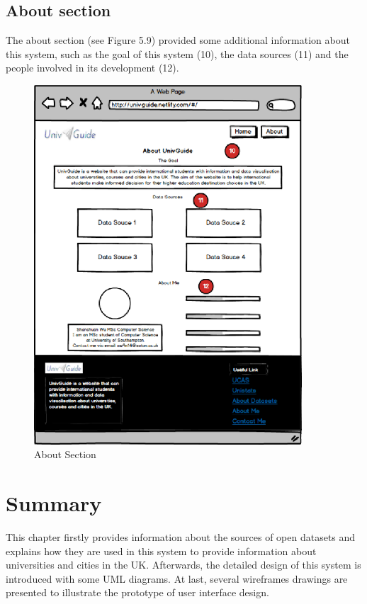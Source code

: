 \subsection{About section
}

The about section (see Figure 5.9) provided some additional information about this system, such as the goal of this system (10), the data sources (11) and the people involved in its development (12).


\begin{figure}[H]
  \centering
  \includegraphics[width=10cm]{./img/Picture15}
  \caption{About Section}
  \label{Figure:figex}
\end{figure}



\section{Summary}

This chapter firstly provides information about the sources of open datasets and explains how they are used in this system to provide information about universities and cities in the UK. Afterwards, the detailed design of this system is introduced with some UML diagrams. At last, several wireframes drawings are presented to illustrate the prototype of user interface design. 





